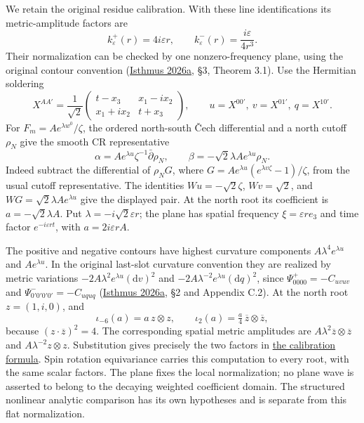 \documentclass[
  english,
  11pt,
  reqno]{amsart}
\begin{document}
We retain the original residue calibration. With these line
identifications its metric-amplitude factors are%
 \[
k^+_\varepsilon(r)=4i\varepsilon r,
\qquad
k^-_\varepsilon(r)=\frac{i\varepsilon}{4r^3}.
\] Their normalization can be checked by one nonzero-frequency plane,
using the original contour convention
(\hyperref[ref-IsthmusLocal2026]{Isthmus 2026a}, §3, Theorem 3.1). Use
the Hermitian soldering \[
X^{AA'}=\frac1{\sqrt2}
\begin{pmatrix}t-x_3&x_1-ix_2\\x_1+ix_2&t+x_3\end{pmatrix},
\qquad
u=X^{00'},\ v=X^{01'},\ q=X^{10'}.
\] For \(F_m=Ae^{\lambda w^0}/\zeta\), the ordered north-south Čech
differential and a north cutoff \(\rho_N\) give the smooth CR
representative \[
\alpha=Ae^{\lambda u}\zeta^{-1}\bar\partial\rho_N,
\qquad
\beta=-\sqrt2\lambda Ae^{\lambda u}\rho_N.
\] Indeed subtract the differential of \(\rho_NG\), where
\(G=Ae^{\lambda u}(e^{\lambda v\zeta}-1)/\zeta\), from the usual cutoff
representative. The identities \(Wu=-\sqrt2\zeta\), \(Wv=\sqrt2\), and
\(WG=\sqrt2\lambda Ae^{\lambda u}\) give the displayed pair. At the
north root its coefficient is \(a=-\sqrt2\lambda A\). Put
\(\lambda=-i\sqrt2\varepsilon r\); the plane has spatial frequency
\(\xi=\varepsilon re_3\) and time factor \(e^{-i\varepsilon rt}\), with
\(a=2i\varepsilon rA\).

The positive and negative contours have highest curvature components
\(A\lambda^4e^{\lambda u}\) and \(Ae^{\lambda u}\). In the original
last-slot curvature convention they are realized by metric variations
\(-2A\lambda^2e^{\lambda u}(\mathrm dv)^2\) and
\(-2A\lambda^{-2}e^{\lambda u}(\mathrm dq)^2\), since
\(\Psi^+_{0000}=-C_{uvuv}\) and \(\Psi^-_{0'0'0'0'}=-C_{uquq}\)
(\hyperref[ref-IsthmusLocal2026]{Isthmus 2026a}, §2 and Appendix C.2).
At the north root \(z=(1,i,0)\), and \[
\iota_{-6}(a)=a\,z\otimes z,
\qquad
\iota_2(a)=\tfrac a4\,\overline z\otimes\overline z,
\] because \((z\cdot\overline z)^2=4\). The corresponding spatial metric
amplitudes are \(A\lambda^2\overline z\otimes\overline z\) and
\(A\lambda^{-2}z\otimes z\). Substitution gives precisely the two
factors in \hyperref[eq:online-root-calibration-factors]{the calibration
formula}. Spin rotation equivariance carries this computation to every
root, with the same scalar factors. The plane fixes the local
normalization; no plane wave is asserted to belong to the decaying
weighted coefficient domain. The structured nonlinear analytic
comparison has its own hypotheses and is separate from this flat
normalization.
\end{document}
